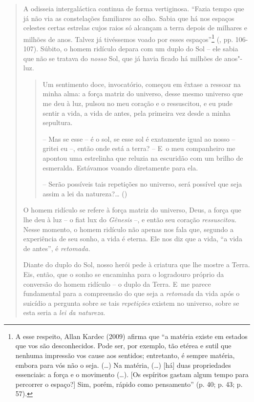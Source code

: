 {\begin{quote}
A odisseia intergaláctica continua de forma vertiginosa. ``Fazia tempo
que já não via as constelações familiares ao olho. Sabia que há nos
espaços celestes certas estrelas cujos raios só alcançam a terra depois
de milhares e milhões de anos. Talvez já tivéssemos voado por esses
espaços''\footnote{A esse respeito, Allan Kardec (2009) afirma que ``a
  matéria existe em estados que vos são desconhecidos. Pode ser, por
  exemplo, tão etérea e sutil que nenhuma impressão vos cause aos
  sentidos; entretanto, é sempre matéria, embora para vós não o seja.
  (\ldots{}) Na matéria, (\ldots{}) {[}há{]} duas propriedades
  essenciais: a força e o movimento (\ldots{}). {[}Os espíritos gastam
  algum tempo para percorrer o espaço?{]} Sim, porém, rápido como
  pensamento'' (p. 40; p. 43; p. 57).} (, pp. 106-107). Súbito, o
homem ridículo depara com um duplo do Sol -- ele sabia que não se
tratava do \emph{nosso} Sol, que já havia ficado há milhões de anos"-luz.

\begin{quote}
Um sentimento doce, invocatório, começou em êxtase a ressoar na minha
alma: a força matriz do universo, desse mesmo universo que me deu à luz,
pulsou no meu coração e o ressuscitou, e eu pude sentir a vida, a vida
de antes, pela primeira vez desde a minha sepultura.

-- Mas se esse -- é o sol, se esse sol é exatamente igual ao nosso --
gritei eu --, então onde está a terra? -- E~o meu companheiro me apontou
uma estrelinha que reluzia na escuridão com um brilho de esmeralda.
Estávamos voando diretamente para ela.

-- Serão possíveis tais repetições no universo, será possível que seja
assim a lei da natureza?\ldots{} ()
\end{quote}

O homem ridículo se refere à força matriz do universo, Deus, a força que
lhe deu à luz -- o fiat lux do \emph{Gênesis} --, e então seu coração
\emph{ressuscitou.} Nesse momento, o homem ridículo não apenas nos fala
que, segundo a experiência de seu sonho, a vida é eterna. Ele nos diz
que a vida, ``a vida de antes'', é \emph{retomada. }

Diante do duplo do Sol, nosso herói pede à criatura que lhe mostre a
Terra. Eis, então, que o sonho se encaminha para o logradouro próprio da
conversão do homem ridículo -- o duplo da Terra. E~me parece fundamental
para a compreensão do que seja a \emph{retomada} da vida após o suicídio
a pergunta sobre se tais \emph{repetições} existem no universo, sobre se
esta seria a \emph{lei da natureza}.


\end{quote}}
